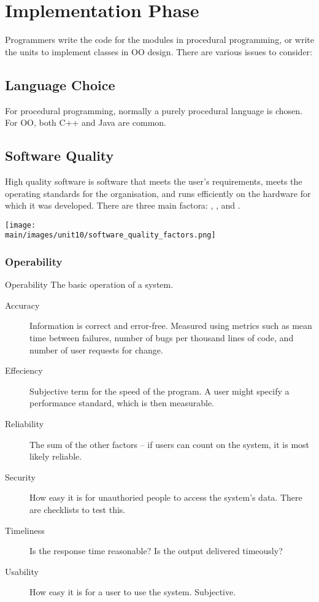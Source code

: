 \documentclass[\main/notes.tex]{subfiles}
\begin{document}
		\pagebreak
		\section{Implementation Phase}
			Programmers write the code for the modules in procedural programming, or write the units to implement classes in OO design. There are various issues to consider:
			\subsection{Language Choice}
				For procedural programming, normally a purely procedural language is chosen. For OO, both C++ and Java are common.
			\subsection{Software Quality}
				High quality software is software that meets the user's requirements, meets the operating standards for the organisation, and runs efficiently on the hardware for which it was developed. There are three main factora: , , and .
				\begin{center}
					\texttt{[image: \\main/images/unit10/software\_quality\_factors.png]}
				\end{center}
				\pagebreak
				\subsubsection{Operability}
					\begin{definition}{Operability}
						The basic operation of a system.
					\end{definition}
					\begin{description}
						\item[Accuracy] Information is correct and error-free. Measured using metrics such as mean time between failures, number of bugs per thousand lines of code, and number of user requests for change.
						\item[Effeciency] Subjective term for the speed of the program. A user might specify a performance standard, which is then measurable.
						\item[Reliability] The sum of the other factors -- if users can count on the system, it is most likely reliable.
						\item[Security] How easy it is for unauthoried people to access the system's data. There are checklists to test this.
						\item[Timeliness] Is the response time reasonable? Is the output delivered timeously?
						\item[Usability] How easy it is for a user to use the system. Subjective.
					\end{description}
\end{document}
